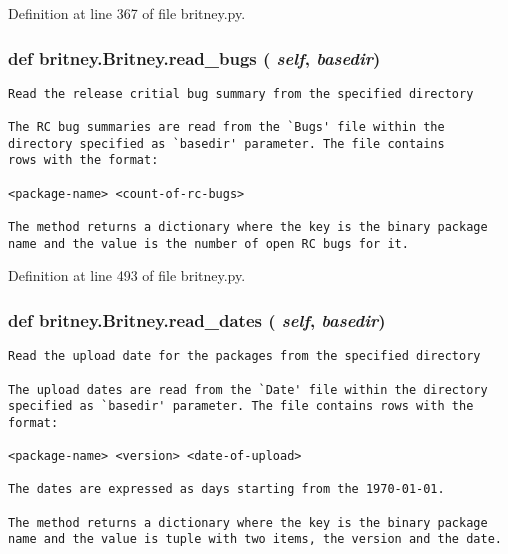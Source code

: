 Definition at line 367 of file britney.py.
\subsubsection{\setlength{\rightskip}{0pt plus 5cm}def britney.Britney.read\_\-bugs ( {\em self},  {\em basedir})}\label{classbritney_1_1Britney_6c777aae69e7bec2efebaf23ddd4a86c}




\footnotesize\begin{verbatim}Read the release critial bug summary from the specified directory

The RC bug summaries are read from the `Bugs' file within the
directory specified as `basedir' parameter. The file contains
rows with the format:

<package-name> <count-of-rc-bugs>

The method returns a dictionary where the key is the binary package
name and the value is the number of open RC bugs for it.
\end{verbatim}
\normalsize
 

Definition at line 493 of file britney.py.
\subsubsection{\setlength{\rightskip}{0pt plus 5cm}def britney.Britney.read\_\-dates ( {\em self},  {\em basedir})}\label{classbritney_1_1Britney_085af5ac906813ea40fc2e623748f517}




\footnotesize\begin{verbatim}Read the upload date for the packages from the specified directory

The upload dates are read from the `Date' file within the directory
specified as `basedir' parameter. The file contains rows with the
format:

<package-name> <version> <date-of-upload>

The dates are expressed as days starting from the 1970-01-01.

The method returns a dictionary where the key is the binary package
name and the value is tuple with two items, the version and the date.
\end{verbatim}
\normalsize
 

